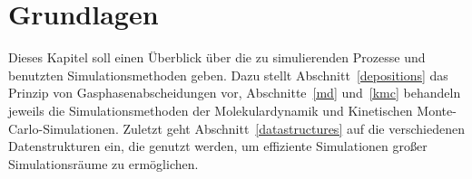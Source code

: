 \cleardoublepage
\chapter{Grundlagen}
\label{theory}

Dieses Kapitel soll einen Überblick über die zu simulierenden Prozesse und benutzten Simulationsmethoden geben.
Dazu stellt Abschnitt~\ref{depositions} das Prinzip von Gasphasenabscheidungen vor, Abschnitte~\ref{md} und~\ref{kmc} behandeln jeweils die Simulationsmethoden der Molekulardynamik und Kinetischen Monte-Carlo-Simulationen.
Zuletzt geht Abschnitt~\ref{datastructures} auf die verschiedenen Datenstrukturen ein, die genutzt werden, um effiziente Simulationen großer Simulationsräume zu ermöglichen.


\clearpage

\clearpage

\clearpage

